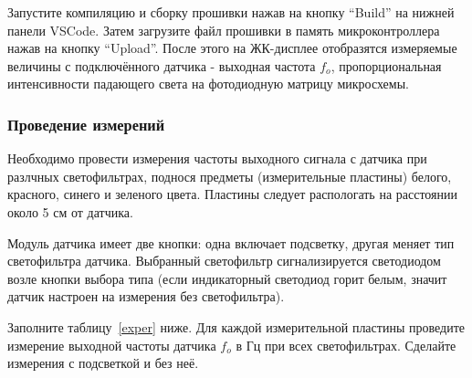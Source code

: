 \documentclass[12pt]{article}
\begin{document}
Запустите компиляцию и сборку прошивки нажав на кнопку ``Build'' на нижней панели VSCode. Затем загрузите файл прошивки в память микроконтроллера нажав на кнопку ``Upload''. После этого на ЖК-дисплее отобразятся измеряемые величины с подключённого датчика - выходная частота \(f_o\), пропорциональная интенсивности падающего света на фотодиодную матрицу микросхемы.

\subsubsection{Проведение измерений}
Необходимо провести измерения частоты выходного сигнала с датчика при разлчных светофильтрах, поднося предметы (измерительные пластины) белого, красного, синего и зеленого цвета. Пластины следует распологать на расстоянии около 5 см от датчика. 

Модуль датчика имеет две кнопки: одна включает подсветку, другая меняет тип светофильтра датчика. Выбранный светофильтр сигнализируется светодиодом возле кнопки выбора типа (если индикаторный светодиод горит белым, значит датчик настроен на измерения без светофильтра). 


Заполните таблицу~\ref{exper} ниже. Для каждой измерительной пластины проведите измерение выходной частоты датчика \(f_o\) в Гц при всех светофильтрах. Сделайте измерения с подсветкой и без неё.
\end{document}
